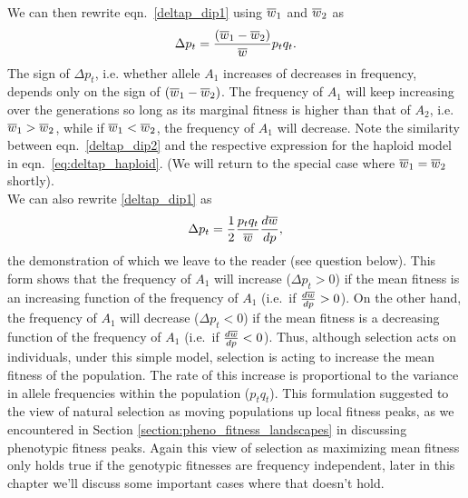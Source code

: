 We can then rewrite eqn.\ \eqref{deltap_dip1} using $\overline{w}_1$ and $\overline{w}_2$ as
\begin{equation}
	\Delta p_t = \frac{ (\overline{w}_1-\overline{w}_2)}{\overline{w}} p_t q_t.
	\label{deltap_dip2}
\end{equation}
The sign of $\Delta p_t$, i.e. whether allele $A_1$ increases of decreases
in frequency, depends only on the sign of $(\overline{w}_1-\overline{w}_2)$.
The frequency of $A_1$ will keep increasing over the generations so
long as its marginal fitness is higher than that of $A_2$,
i.e.\ $\overline{w}_1 > \overline{w}_2$, while if $\overline{w}_1 < \overline{w}_2$, the
frequency of $A_1$ will decrease. Note the similarity between eqn.\ \eqref{deltap_dip2} and the respective expression for the haploid model in eqn.\ \eqref{eq:deltap_haploid}. (We will return to the
special case where $\overline{w}_1 = \overline{w}_2$ shortly).\\

We can also rewrite \eqref{deltap_dip1} as
\begin{equation}
\Delta p_t =\frac{1}{2} \frac{p_tq_t}{\overline{w}} \frac{d \overline{w}}{dp}, 
\label{deltap_dip3}
\end{equation}
the demonstration of which we leave to the reader (see question below).
This form shows that the frequency of $A_1$ will increase ($\Delta p_t > 0$) if the mean fitness is an increasing function of the frequency of $A_1$ (i.e.\ if $\frac{d \overline{w}}{dp}>0$). On the other hand, the frequency of $A_1$ will decrease ($\Delta p_t < 0$) if the mean fitness is a decreasing function of the frequency of $A_1$ (i.e.\ if $\frac{d \overline{w}}{dp}<0$).
Thus, although selection acts on
individuals, under this simple model, selection is acting to increase
the mean fitness of the population. The rate of this increase is proportional to
the variance in allele frequencies within the population
($p_tq_t$). This formulation suggested to \citet{wright1932} the view of natural
selection as moving populations up local fitness peaks, as we
encountered in Section \ref{section:pheno_fitness_landscapes} in
discussing phenotypic fitness peaks. Again this view of selection as
maximizing mean fitness only holds true
if the genotypic fitnesses are frequency independent, later in this
chapter we'll discuss some important cases where that doesn't hold. \\

